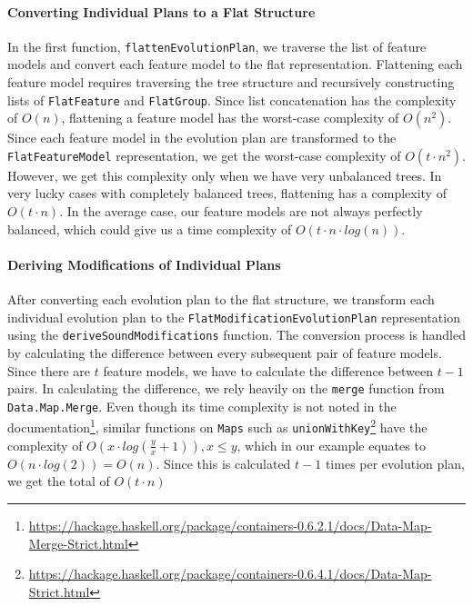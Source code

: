 \documentclass[a4paper,english]{ifimaster}
\begin{document}
\paragraph{Converting Individual Plans to a Flat Structure}

In the first function, \texttt{flatten\-Evolution\-Plan}, we traverse the list of feature models and convert each feature model to the flat representation. Flattening each feature model requires traversing the tree structure and recursively constructing lists of \texttt{FlatFeature} and \texttt{FlatGroup}. Since list concatenation has the complexity of $O(n)$, flattening a feature model has the worst-case complexity of $O(n^2)$. Since each feature model in the evolution plan are transformed to the \texttt{FlatFeatureModel} representation, we get the worst-case complexity of $O(t \cdot n^2)$. However, we get this complexity only when we have very unbalanced trees. In very lucky cases with completely balanced trees, flattening has a complexity of $O(t \cdot n)$. In the average case, our feature models are not always perfectly balanced, which could give us a time complexity of $O(t \cdot n \cdot log(n))$.

\paragraph{Deriving Modifications of Individual Plans}

After converting each evolution plan to the flat structure, we transform each individual evolution plan to the \texttt{Flat\-Modification\-Evolution\-Plan} representation using the \texttt{derive\-Sound\-Modifications} function. The conversion process is handled by calculating the difference between every subsequent pair of feature models. Since there are $t$ feature models, we have to calculate the difference between $t-1$ pairs. In calculating the difference, we rely heavily on the \texttt{merge} function from \texttt{Data.Map.Merge}. Even though its time complexity is not noted in the documentation\footnote{\url{https://hackage.haskell.org/package/containers-0.6.2.1/docs/Data-Map-Merge-Strict.html}}, similar functions on \texttt{Maps} such as \texttt{unionWithKey}\footnote{\url{https://hackage.haskell.org/package/containers-0.6.4.1/docs/Data-Map-Strict.html}} have the complexity of $O(x \cdot log(\frac{y}{x} + 1)), x \leq y$, which in our example equates to $O(n \cdot log(2)) = O(n)$. Since this is calculated $t-1$ times per evolution plan, we get the total of $O(t \cdot n)$
\end{document}
